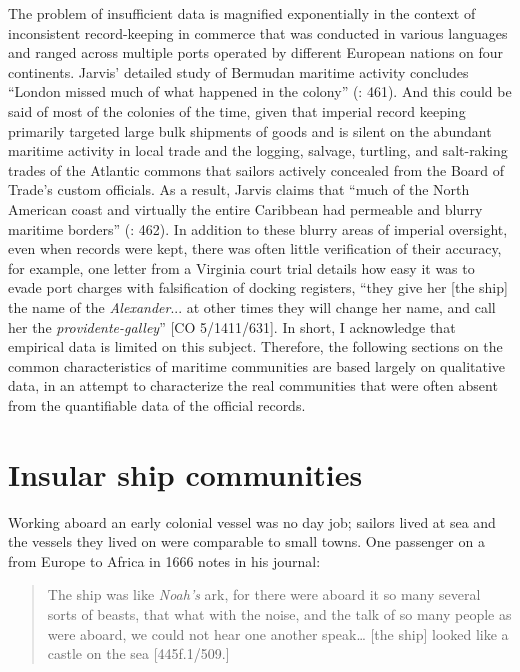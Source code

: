 The problem of insufficient data is magnified exponentially in the context of inconsistent record-keeping in  commerce that was conducted in various languages and ranged across multiple ports operated by different European nations on four continents. Jarvis’ detailed study of Bermudan maritime activity concludes “London missed much of what happened in the colony” (\citealt{Jarvis2010}: 461). And this could be said of most of the colonies of the time, given that imperial record keeping primarily targeted large bulk shipments of goods and is silent on the abundant maritime activity in local trade and the logging, salvage, turtling, and salt-raking trades of the Atlantic commons that sailors actively concealed from the Board of Trade’s custom officials. As a result, Jarvis claims that “much of the North American coast and virtually the entire Caribbean had permeable and blurry maritime borders” (\citealt{Jarvis2010}: 462). In addition to these blurry areas of imperial oversight, even when records were kept, there was often little verification of their accuracy, for example, one letter from a Virginia court trial details how easy it was to evade port charges with falsification of docking registers, “they give her [the ship] the name of the \textit{Alexander}... at other times they will change her name, and call her the \textit{providente-galley}” [CO 5/1411/631]. In short, I acknowledge that empirical data is limited on this subject.  Therefore, the following sections on the common characteristics of maritime communities are based largely on qualitative data, in an attempt to characterize the real communities that were often absent from the quantifiable data of the official records.

\section{{Insular ship communities}}\label{sec:4.2}

Working aboard an early colonial vessel was no day job; sailors lived at sea and the vessels they lived on were comparable to small towns. One passenger on a  from Europe to Africa in 1666 notes in his journal: 

\begin{quotation}
The ship was like \textit{Noah’s} ark, for there were aboard it so many several sorts of beasts, that what with the noise, and the talk of so many people as were aboard, we could not hear one another speak… [the ship] looked like a castle on the sea [445f.1/509.]
\end{quotation}

